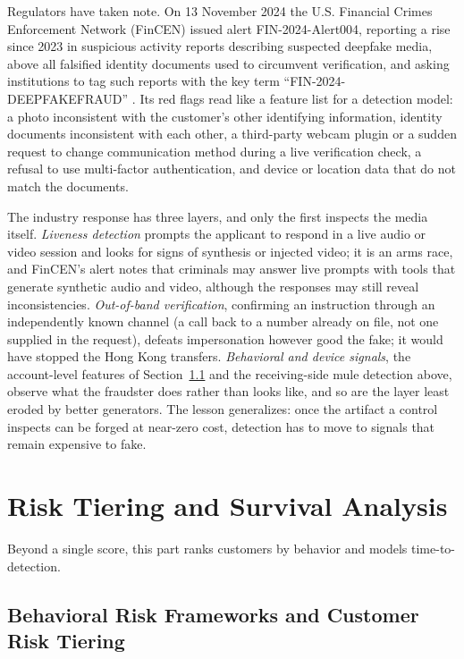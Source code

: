 \documentclass[../ai_in_finance]{subfiles}
\begin{document}
Regulators have taken note. On 13 November 2024 the U.S. Financial Crimes Enforcement Network (FinCEN) issued alert FIN-2024-Alert004, reporting a rise since 2023 in suspicious activity reports describing suspected deepfake media, above all falsified identity documents used to circumvent verification, and asking institutions to tag such reports with the key term ``FIN-2024-DEEPFAKEFRAUD'' \parencite{fincen2024deepfake}. Its red flags read like a feature list for a detection model: a photo inconsistent with the customer's other identifying information, identity documents inconsistent with each other, a third-party webcam plugin or a sudden request to change communication method during a live verification check, a refusal to use multi-factor authentication, and device or location data that do not match the documents.

The industry response has three layers, and only the first inspects the media itself. \emph{Liveness detection} prompts the applicant to respond in a live audio or video session and looks for signs of synthesis or injected video; it is an arms race, and FinCEN's alert notes that criminals may answer live prompts with tools that generate synthetic audio and video, although the responses may still reveal inconsistencies. \emph{Out-of-band verification}, confirming an instruction through an independently known channel (a call back to a number already on file, not one supplied in the request), defeats impersonation however good the fake; it would have stopped the Hong Kong transfers. \emph{Behavioral and device signals}, the account-level features of Section~\ref{sec:risk-tiering} and the receiving-side mule detection above, observe what the fraudster does rather than looks like, and so are the layer least eroded by better generators. The lesson generalizes: once the artifact a control inspects can be forged at near-zero cost, detection has to move to signals that remain expensive to fake.

\section{Risk Tiering and Survival Analysis}

Beyond a single score, this part ranks customers by behavior and models time-to-detection.

\subsection{Behavioral Risk Frameworks and Customer Risk Tiering}
\label{sec:risk-tiering}
\end{document}
